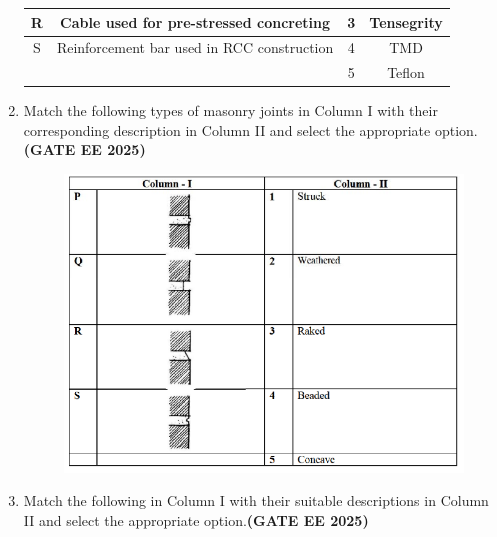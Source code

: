 \documentclass[journal,12pt,onecolumn]{IEEEtran}
\theoremstyle{remark}
\begin{document}
\begin{enumerate}
\begin{tabular}{|c|c|c|c|}
 R&Cable used for pre-stressed concreting &3&Tensegrity\\ \hline
 S&Reinforcement bar used in RCC construction&4&TMD\\ \hline
    & &5&Teflon\\ \hline
 \end{tabular}
 \begin{enumerate}
 \end{enumerate}
 \item Match the following types of masonry joints in Column I with their corresponding description in Column II and select the appropriate option. \hfill \textbf{(GATE EE 2025)}\\
 \begin{figure}[H]
     \centering
     \includegraphics[width=0.5\linewidth]{figs/fig2.png}
     \caption{}
     \label{fig2}
 \end{figure}
 \begin{enumerate}
 \end{enumerate}
 \item Match the following in Column I with their suitable descriptions in Column II and select the appropriate option.\hfill \textbf{(GATE EE 2025)}\\
 \begin{tabular}{|c|c|c|c|} \hline

\end{tabular}
\end{enumerate}
\end{document}
